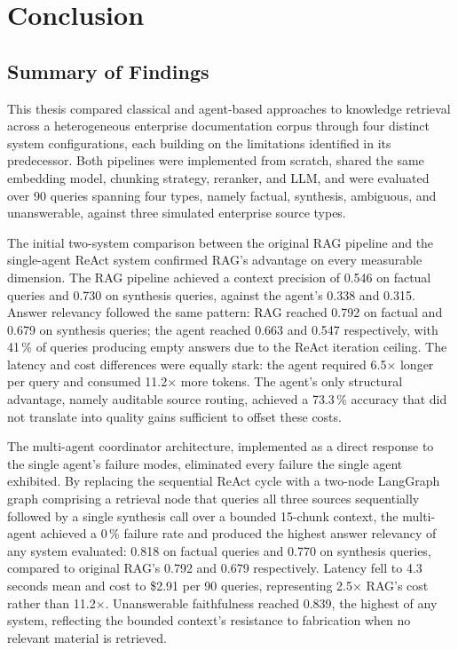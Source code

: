 
\chapter{Conclusion}
\label{ch:conclusion}

\section{Summary of Findings}

This thesis compared classical and agent-based approaches to knowledge retrieval across a heterogeneous enterprise documentation corpus through four distinct system configurations, each building on the limitations identified in its predecessor. Both pipelines were implemented from scratch, shared the same embedding model, chunking strategy, reranker, and LLM, and were evaluated over 90 queries spanning four types, namely factual, synthesis, ambiguous, and unanswerable, against three simulated enterprise source types.

The initial two-system comparison between the original RAG pipeline and the single-agent ReAct system confirmed RAG's advantage on every measurable dimension. The RAG pipeline achieved a context precision of 0.546 on factual queries and 0.730 on synthesis queries, against the agent's 0.338 and 0.315. Answer relevancy followed the same pattern: RAG reached 0.792 on factual and 0.679 on synthesis queries; the agent reached 0.663 and 0.547 respectively, with 41\,\% of queries producing empty answers due to the ReAct iteration ceiling. The latency and cost differences were equally stark: the agent required 6.5$\times$ longer per query and consumed 11.2$\times$ more tokens. The agent's only structural advantage, namely auditable source routing, achieved a 73.3\,\% accuracy that did not translate into quality gains sufficient to offset these costs.

The multi-agent coordinator architecture, implemented as a direct response to the single agent's failure modes, eliminated every failure the single agent exhibited. By replacing the sequential ReAct cycle with a two-node LangGraph graph comprising a retrieval node that queries all three sources sequentially followed by a single synthesis call over a bounded 15-chunk context, the multi-agent achieved a 0\,\% failure rate and produced the highest answer relevancy of any system evaluated: 0.818 on factual queries and 0.770 on synthesis queries, compared to original RAG's 0.792 and 0.679 respectively. Latency fell to 4.3 seconds mean and cost to \$2.91 per 90 queries, representing 2.5$\times$ RAG's cost rather than 11.2$\times$. Unanswerable faithfulness reached 0.839, the highest of any system, reflecting the bounded context's resistance to fabrication when no relevant material is retrieved.

